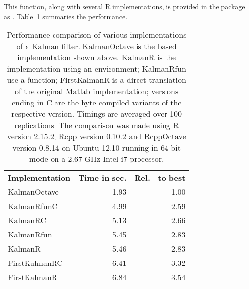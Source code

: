 This function, along with several R implementations, is provided in the
 package as .
Table~\ref{tab:benchmark} summaries the performance.


\begin{table}[tb]
  \begin{center}
    \begin{small}
      \begin{tabular}{lrr}
        \toprule
        {\bf Implementation \phantom{XX}} & {\bf Time in sec.} & {\bf Rel.~ to best} \\
        \cmidrule(r){1-3}
         KalmanOctave  & 1.93 & 1.00 \\
          KalmanRfunC  & 4.99 & 2.59 \\
             KalmanRC  & 5.13 & 2.66 \\
           KalmanRfun  & 5.45 & 2.83 \\
              KalmanR  & 5.46 & 2.83 \\
        FirstKalmanRC  & 6.41 & 3.32 \\
         FirstKalmanR  & 6.84 & 3.54 \\
         \bottomrule
      \end{tabular}
      \caption{Performance comparison of various implementations of a Kalman filter.
        KalmanOctave is the  based implementation shown above.
        KalmanR is the \R implementation using an environment; KalmanRfun use a
        function; FirstKalmanR is a direct translation of the original Matlab
        implementation; versions ending in C are the byte-compiled variants of
        the respective version.  Timings are averaged over 100 replications.
        The comparison was made using R version 2.15.2, Rcpp version 0.10.2 and
        RcppOctave version 0.8.14 on Ubuntu 12.10 running in 64-bit mode on a
        2.67 GHz Intel i7 processor.}
      \label{tab:benchmark}
    \end{small}
  \end{center}
\end{table}


